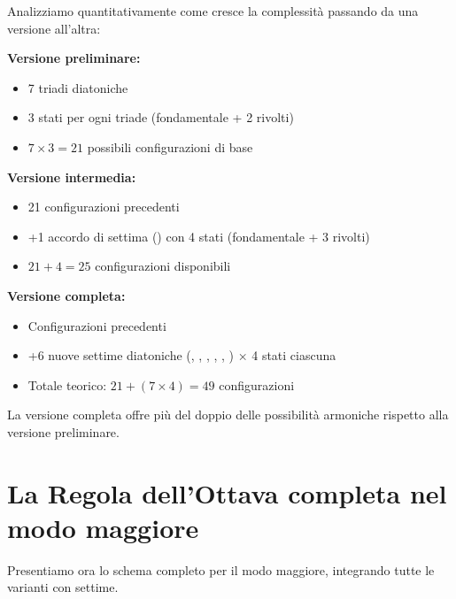 \begin{matematica}
	Analizziamo quantitativamente come cresce la complessità passando da una versione all'altra:
	
	\textbf{Versione preliminare:}
	\begin{itemize}
		\item 7 triadi diatoniche
		\item 3 stati per ogni triade (fondamentale + 2 rivolti)
		\item $7 \times 3 = 21$ possibili configurazioni di base
	\end{itemize}
	
	\textbf{Versione intermedia:}
	\begin{itemize}
		\item 21 configurazioni precedenti
		\item +1 accordo di settima () con 4 stati (fondamentale + 3 rivolti)
		\item $21 + 4 = 25$ configurazioni disponibili
	\end{itemize}
	
	\textbf{Versione completa:}
	\begin{itemize}
		\item Configurazioni precedenti
		\item +6 nuove settime diatoniche (, , , , , ) × 4 stati ciascuna
		\item Totale teorico: $21 + (7 \times 4) = 49$ configurazioni
	\end{itemize}
	
	La versione completa offre più del doppio delle possibilità armoniche rispetto alla versione preliminare.
\end{matematica}

\section{La Regola dell'Ottava completa nel modo maggiore}
\label{sec:regola_completa_maggiore}

Presentiamo ora lo schema completo per il modo maggiore, integrando tutte le varianti con settime.

